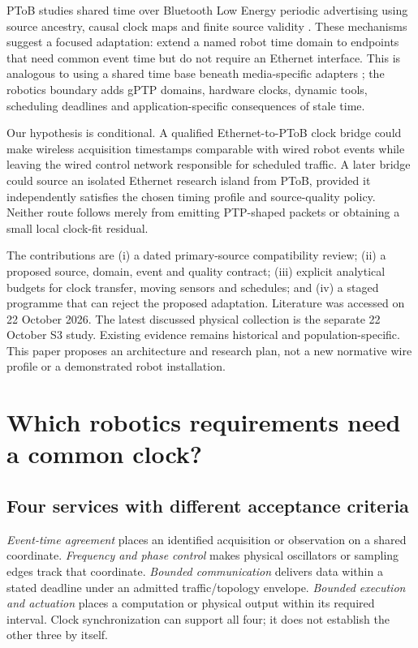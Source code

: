 \documentclass[11pt,letterpaper]{article}
\begin{document}
PToB studies shared time over Bluetooth Low Energy periodic advertising using source ancestry, causal clock maps and finite source validity \cite{viability}. These mechanisms suggest a focused adaptation: extend a named robot time domain to endpoints that need common event time but do not require an Ethernet interface. This is analogous to using a shared time base beneath media-specific adapters \cite{timecode}; the robotics boundary adds gPTP domains, hardware clocks, dynamic tools, scheduling deadlines and application-specific consequences of stale time.

Our hypothesis is conditional. A qualified Ethernet-to-PToB clock bridge could make wireless acquisition timestamps comparable with wired robot events while leaving the wired control network responsible for scheduled traffic. A later bridge could source an isolated Ethernet research island from PToB, provided it independently satisfies the chosen timing profile and source-quality policy. Neither route follows merely from emitting PTP-shaped packets or obtaining a small local clock-fit residual.

The contributions are (i) a dated primary-source compatibility review; (ii) a proposed source, domain, event and quality contract; (iii) explicit analytical budgets for clock transfer, moving sensors and schedules; and (iv) a staged programme that can reject the proposed adaptation. Literature was accessed on 22 October 2026. The latest discussed physical collection is the separate 22 October S3 study. Existing evidence remains historical and population-specific. This paper proposes an architecture and research plan, not a new normative wire profile or a demonstrated robot installation.

\section{Which robotics requirements need a common clock?}
\subsection{Four services with different acceptance criteria}
\emph{Event-time agreement} places an identified acquisition or observation on a shared coordinate. \emph{Frequency and phase control} makes physical oscillators or sampling edges track that coordinate. \emph{Bounded communication} delivers data within a stated deadline under an admitted traffic/topology envelope. \emph{Bounded execution and actuation} places a computation or physical output within its required interval. Clock synchronization can support all four; it does not establish the other three by itself.
\end{document}
